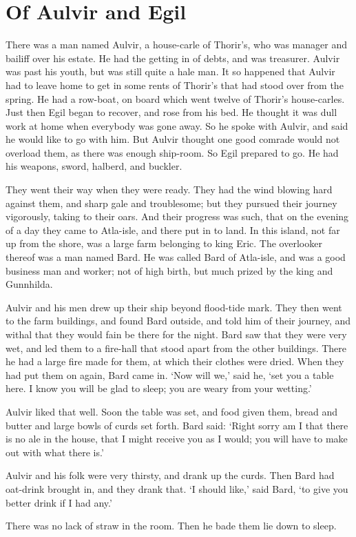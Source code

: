 \chapter{Of Aulvir and Egil}

There was a man named Aulvir, a house-carle of Thorir's, who was manager and bailiff over his estate. He had the getting in of debts, and was treasurer. Aulvir was past his youth, but was still quite a hale man. It so happened that Aulvir had to leave home to get in some rents of Thorir's that had stood over from the spring. He had a row-boat, on board which went twelve of Thorir's house-carles. Just then Egil began to recover, and rose from his bed. He thought it was dull work at home when everybody was gone away. So he spoke with Aulvir, and said he would like to go with him. But Aulvir thought one good comrade would not overload them, as there was enough ship-room. So Egil prepared to go. He had his weapons, sword, halberd, and buckler.

They went their way when they were ready. They had the wind blowing hard against them, and sharp gale and troublesome; but they pursued their journey vigorously, taking to their oars. And their progress was such, that on the evening of a day they came to Atla-isle, and there put in to land. In this island, not far up from the shore, was a large farm belonging to king Eric. The overlooker thereof was a man named Bard. He was called Bard of Atla-isle, and was a good business man and worker; not of high birth, but much prized by the king and Gunnhilda.

Aulvir and his men drew up their ship beyond flood-tide mark. They then went to the farm buildings, and found Bard outside, and told him of their journey, and withal that they would fain be there for the night. Bard saw that they were very wet, and led them to a fire-hall that stood apart from the other buildings. There he had a large fire made for them, at which their clothes were dried. When they had put them on again, Bard came in. `Now will we,' said he, `set you a table here. I know you will be glad to sleep; you are weary from your wetting.'

Aulvir liked that well. Soon the table was set, and food given them, bread and butter and large bowls of curds set forth. Bard said: `Right sorry am I that there is no ale in the house, that I might receive you as I would; you will have to make out with what there is.'

Aulvir and his folk were very thirsty, and drank up the curds. Then Bard had oat-drink brought in, and they drank that. `I should like,' said Bard, `to give you better drink if I had any.'

There was no lack of straw in the room. Then he bade them lie down to sleep.
